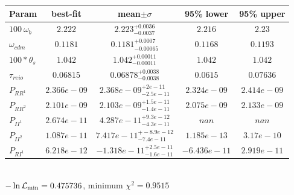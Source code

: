 \begin{tabular}{|l|c|c|c|c|} 
 \hline 
Param & best-fit & mean$\pm\sigma$ & 95\% lower & 95\% upper \\ \hline 
$100~\omega_{b }$ &$2.222$ & $2.223_{-0.0037}^{+0.0036}$ & $2.216$ & $2.23$ \\ 
$\omega_{cdm }$ &$0.1181$ & $0.1181_{-0.00065}^{+0.0007}$ & $0.1168$ & $0.1193$ \\ 
$100*\theta_{s }$ &$1.042$ & $1.042_{-0.00011}^{+0.00011}$ & $1.042$ & $1.042$ \\ 
$\tau_{reio }$ &$0.06815$ & $0.06878_{-0.0038}^{+0.0038}$ & $0.0615$ & $0.07636$ \\ 
$P_{{RR}^1 }$ &$2.366e-09$ & $2.368e-09_{-2.5e-11}^{+2e-11}$ & $2.324e-09$ & $2.414e-09$ \\ 
$P_{{RR}^2 }$ &$2.101e-09$ & $2.103e-09_{-1.4e-11}^{+1.5e-11}$ & $2.075e-09$ & $2.133e-09$ \\ 
$P_{{II}^1 }$ &$2.674e-11$ & $4.287e-11_{-4.3e-11}^{+9.3e-12}$ & $nan$ & $nan$ \\ 
$P_{{II}^2 }$ &$1.087e-11$ & $7.417e-11_{-7.4e-11}^{+-8.9e-12}$ & $1.185e-13$ & $3.17e-10$ \\ 
$P_{{RI}^1 }$ &$6.218e-12$ & $-1.318e-11_{-1.6e-11}^{+2.5e-11}$ & $-6.436e-11$ & $2.919e-11$ \\ 
\hline 
 \end{tabular} \\ 
$-\ln{\cal L}_\mathrm{min} =0.475736$, minimum $\chi^2=0.9515$ \\ 
